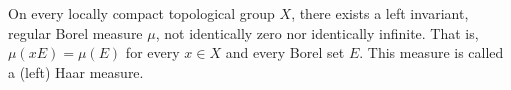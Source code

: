 On every locally compact topological group $X$, there exists a left invariant, regular Borel measure $\mu$, not identically zero nor identically infinite. That is, $\mu(xE) = \mu(E)$ for every $x \in X$ and every Borel set $E$. This measure is called a (left) Haar measure.

